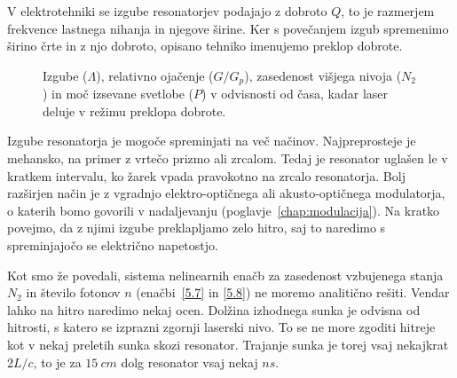\begin{remark}
V elektrotehniki se izgube resonatorjev podajajo z dobroto $Q$, to je razmerjem
frekvence lastnega nihanja in njegove širine. Ker s povečanjem izgub spremenimo 
širino črte in z njo dobroto, opisano tehniko imenujemo preklop 
dobrote.
\end{remark}

\begin{figure}[h]
\centering
\def\svgwidth{90truemm} 

\caption{Izgube ($\Lambda$), relativno ojačenje ($G/G_p$), zasedenost višjega 
nivoja ($N_2$) in moč izsevane svetlobe ($P$) v odvisnosti od časa, kadar laser 
deluje v režimu preklopa dobrote.}
\label{fig:pulseQ}
\end{figure}

Izgube resonatorja je mogoče spreminjati na več načinov. Najpreprosteje
je mehansko, na primer z vrtečo prizmo ali zrcalom. Tedaj je resonator uglašen le v kratkem
intervalu, ko žarek vpada pravokotno na zrcalo resonatorja. Bolj razširjen način 
je z vgradnjo elektro-optičnega ali akusto-optičnega modulatorja, o katerih
bomo govorili v nadaljevanju (poglavje~\ref{chap:modulacija}). Na kratko povejmo, 
da z njimi izgube preklapljamo zelo hitro, saj to naredimo s spreminjajočo se 
električno napetostjo.

Kot smo že povedali, sistema nelinearnih enačb za zasedenost vzbujenega stanja $N_2$ 
in število fotonov $n$
(enačbi~\ref{5.7} in \ref{5.8}) ne moremo analitično rešiti. Vendar lahko na hitro
naredimo nekaj ocen. Dolžina izhodnega sunka je odvisna od hitrosti, 
s katero se izprazni zgornji laserski nivo. To se ne more zgoditi
hitreje kot v nekaj preletih sunka skozi resonator. Trajanje sunka je torej
vsaj nekajkrat $2L/c$, to je za $15~\si{cm}$ dolg resonator vsaj nekaj $\si{ns}$.

